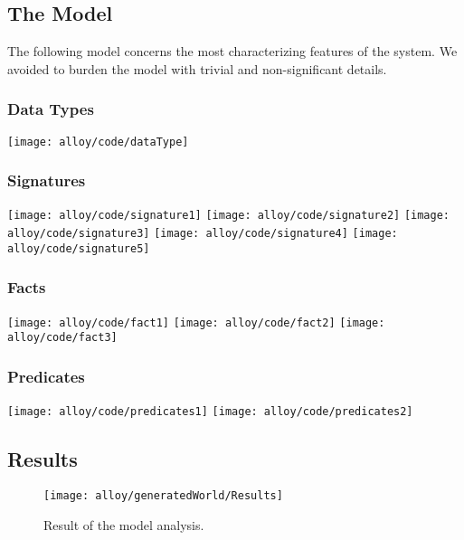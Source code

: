 \subsection{The Model}
	The following model concerns the most characterizing features of the system. We avoided to burden the model with trivial and non-significant details.
	
	\subsubsection*{Data Types}
		\texttt{[image: alloy/code/dataType]}

	\subsubsection*{Signatures}
		\texttt{[image: alloy/code/signature1]}
		\vfill
		\texttt{[image: alloy/code/signature2]}
		\vfill
		\texttt{[image: alloy/code/signature3]}	   
		\vfill
		\texttt{[image: alloy/code/signature4]}
		\vfill
		\texttt{[image: alloy/code/signature5]}
		\bigskip
	
	\subsubsection*{Facts}
		\texttt{[image: alloy/code/fact1]}
		\vfill
		\texttt{[image: alloy/code/fact2]}
		\vfill
		\texttt{[image: alloy/code/fact3]}
		\bigskip
	
	\subsubsection*{Predicates}
		\texttt{[image: alloy/code/predicates1]}
		\vfill
		\texttt{[image: alloy/code/predicates2]}
		\bigskip
		
		
\subsection{Results}
	\begin{figure}[H]
		\centering
		\texttt{[image: alloy/generatedWorld/Results]}
		\caption{Result of the model analysis.}		
		\label{fig:alloyResult}
	\end{figure}
	\bigskip
	
	
	
